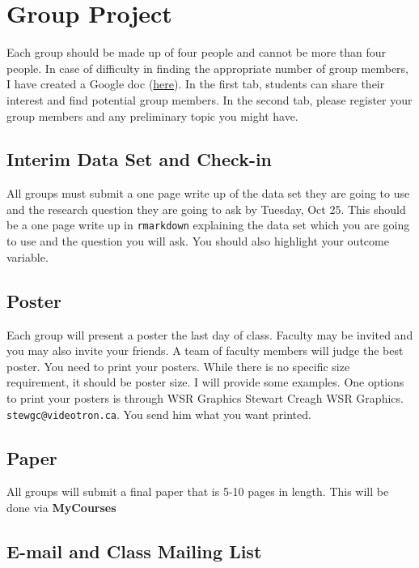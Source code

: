 \documentclass[11pt,]{article}
\begin{document}
\section{Group Project}\label{group-project}

Each group should be made up of four people and cannot be more than four
people. In case of difficulty in finding the appropriate number of group
members, I have created a Google doc
(\href{https://docs.google.com/spreadsheets/d/1WbFUYr7v0FBzQlHUTkLxFZTt4A8Mib5wv5apeSnKx4M/edit?usp=sharing}{here}).
In the first tab, students can share their interest and find potential
group members. In the second tab, please register your group members and
any preliminary topic you might have.

\subsection{Interim Data Set and
Check-in}\label{interim-data-set-and-check-in}

All groups must submit a one page write up of the data set they are
going to use and the research question they are going to ask by Tuesday,
Oct 25. This should be a one page write up in \texttt{rmarkdown}
explaining the data set which you are going to use and the question you
will ask. You should also highlight your outcome variable.

\subsection{Poster}\label{poster}

Each group will present a poster the last day of class. Faculty may be
invited and you may also invite your friends. A team of faculty members
will judge the best poster. You need to print your posters. While there
is no specific size requirement, it should be poster size. I will
provide some examples. One options to print your posters is through WSR
Graphics Stewart Creagh WSR Graphics. \texttt{stewgc@videotron.ca}. You
send him what you want printed.

\subsection{Paper}\label{paper}

All groups will submit a final paper that is 5-10 pages in length. This
will be done via \textbf{MyCourses}

\subsection{E-mail and Class Mailing
List}\label{e-mail-and-class-mailing-list}
\end{document}
